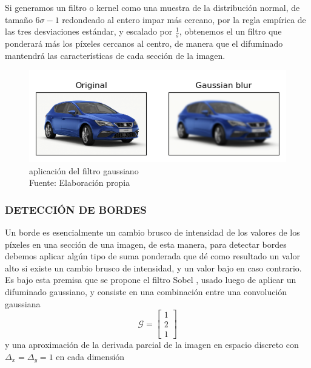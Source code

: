         Si generamos un filtro o kernel como una muestra de la distribución normal, de tamaño $6\sigma-1$ redondeado al entero impar más cercano, por la regla empírica de las tres desviaciones estándar, y escalado por $\frac{1}{s}$, obtenemos el un filtro que ponderará más los píxeles cercanos al centro, de manera que el difuminado mantendrá las características de cada sección de la imagen.
        
        \begin{figure}[H]
            \centering
            \includegraphics[scale=0.48]{imagenes/blur}
            \caption{aplicación del filtro gaussiano\\ Fuente: Elaboración propia}
        \end{figure}
        \subsubsection{DETECCIÓN DE BORDES}
        Un borde es esencialmente un cambio brusco de intensidad de los valores de los píxeles en una sección de una imagen, de esta manera, para detectar bordes debemos aplicar algún tipo de suma ponderada que dé como resultado un valor alto si existe un cambio brusco de intensidad, y un valor bajo en caso contrario. 
        Es bajo esta premisa que se propone el filtro Sobel \citep{sobel}, usado luego de aplicar un difuminado gaussiano, y consiste en una combinación entre una convolución gaussiana
        $$\mathcal{G} = \begin{bmatrix}
                                    1\\
                                    2\\
                                    1
                        \end{bmatrix}$$
        \noindent y una aproximación de la derivada parcial de la imagen en espacio discreto con $\Delta_x = \Delta_y = 1$ en cada dimensión
        
